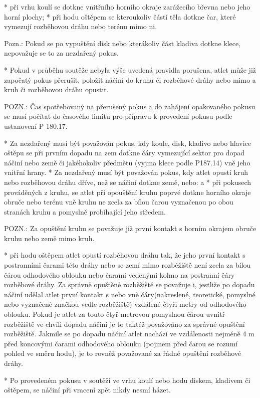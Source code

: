   * při vrhu koulí se dotkne vnitřního horního okraje zarážecího břevna nebo jeho horní plochy;
  * při hodu oštěpem se kteroukoliv částí těla dotkne čar, které vymezují rozběhovou dráhu nebo terénu mimo ni.
  \enditems

Pozn.: Pokud se po vypuštění disk nebo kterákoliv část kladiva dotkne klece, nepovažuje se to za nezdařený pokus.

* Pokud v průběhu soutěže nebyla výše uvedená pravidla porušena, atlet může již započatý pokus přerušit, položit náčiní do kruhu či rozběhové dráhy nebo mimo a kruh či rozběhovou dráhu opustit.

POZN.: Čas spotřebovaný na přerušený pokus a do zahájení opakovaného pokusu se musí počítat do časového limitu pro přípravu k provedení pokusu podle ustanovení P 180.17.

* Za nezdařený musí být považován pokus, kdy koule, disk, kladivo nebo hlavice oštěpu se při prvním dopadu na zem dotkne čáry vymezující sektor pro dopad náčiní nebo země či jakéhokoliv předmětu (vyjma klece podle P187.14) vně jeho vnitřní hrany.
* Za nezdařený musí být považován pokus, kdy atlet opustí kruh nebo rozběhovou dráhu dříve, než se náčiní dotkne země, nebo:
  \begitems \style a
  * při pokusech prováděných z kruhu, se atlet při opouštění kruhu poprvé dotkne horního okraje obruče nebo terénu vně kruhu  ne zcela za bílou čarou vyznačenou po obou stranách kruhu a pomyslně probíhající jeho středem.

  POZN.: Za opuštění kruhu se považuje již první kontakt s horním okrajem obruče kruhu nebo země mimo kruh.

  * při hodu oštěpem atlet opustí rozběhovou dráhu tak, že jeho první kontakt s postranními čarami této dráhy nebo se zemí mimo rozběžiště není zcela za bílou čárou odhodového oblouku nebo čarami vedenými kolmo na postranní čáry rozběhové dráhy. Za správně opuštěné rozběžiště se považuje i, jestliže po dopadu náčiní udělal atlet první kontakt s nebo vně čáry(nakreslené, teoretické, pomyslné nebo vyznačené značkou vedle rozběžiště) vzdálené čtyři metry od odhodového oblouku. Pokud je atlet za touto čtyř metrovou pomyslnou čárou uvnitř rozběžiště ve chvíli dopadu náčiní je to taktéž považováno za správné opuštění rozběžiště. Jakmile se po dopadu náčiní atlet nachází ve vzdálenosti nejméně 4 m před koncovými čarami odhodového oblouku (pojmem před čarou se rozumí pohled ve směru hodu), je to rovněž považované za řádné opuštění rozběhové dráhy.
  \enditems

* Po provedeném pokusu v soutěži ve vrhu koulí nebo hodu diskem, kladivem či oštěpem, se náčiní při vracení zpět nikdy  nesmí házet.

